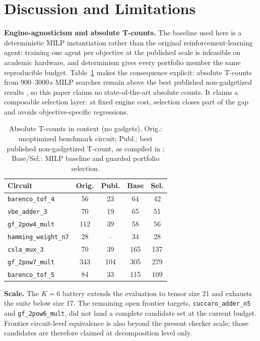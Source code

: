 \documentclass{cbctq}
\begin{document}
\section{Discussion and Limitations}

\textbf{Engine-agnosticism and absolute T-counts.} The baseline used here is a deterministic MILP instantiation rather than the original reinforcement-learning agent: training one agent per objective at the published scale is infeasible on academic hardware, and determinism gives every portfolio member the same reproducible budget. Table~\ref{tab:context} makes the consequence explicit: absolute T-counts from 900--3000\,s MILP searches remain above the best published non-gadgetized results \cite{ruiz2025}, so this paper claims no state-of-the-art absolute counts. It claims a composable selection layer: at fixed engine cost, selection closes part of the gap and avoids objective-specific regressions.

\begin{table}[hbt]
\centering
\caption{\footnotesize Absolute T-counts in context (no gadgets). Orig.: unoptimized benchmark circuit; Publ.: best published non-gadgetized T-count, as compiled in \cite{ruiz2025}; Base/Sel.: MILP baseline and guarded portfolio selection.}
\label{tab:context}
\footnotesize
\begin{tabular}{lcccc}
\toprule
Circuit & Orig. & Publ. & Base & Sel. \\
\midrule
\texttt{barenco\_tof\_4}    & 56  & 23 & 64 & 42 \\
\texttt{vbe\_adder\_3}      & 70  & 19 & 65 & 51 \\
\texttt{gf\_2pow4\_mult}    & 112 & 39 & 58 & 56 \\
\texttt{hamming\_weight\_n7}& 28  & -- & 34 & 28 \\
\texttt{csla\_mux\_3}       & 70  & 39 & 165 & 137 \\
\texttt{gf\_2pow7\_mult}    & 343 & 104 & 305 & 279 \\
\texttt{barenco\_tof\_5}    & 84  & 33 & 115 & 109 \\
\bottomrule
\end{tabular}
\end{table}

\textbf{Scale.} The $K=6$ battery extends the evaluation to tensor size 21 and exhausts the suite below size 17. The remaining open frontier targets, \texttt{cuccaro\_adder\_n5} and \texttt{gf\_2pow6\_mult}, did not land a complete candidate set at the current budget. Frontier circuit-level equivalence is also beyond the present checker scale; those candidates are therefore claimed at decomposition level only.
\end{document}

